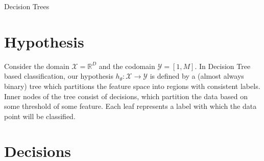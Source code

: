 \documentclass[12pt]{article}
\begin{document}
\begin{center}
	\LARGE{Decision Trees}
\end{center}

\section{Hypothesis}

Consider the domain $\mathcal{X} = \mathbb{R}^D$ and the codomain  $\mathcal{Y} =[1, M]$. In Decision Tree based classification, our hypothesis $h_\theta : \mathcal{X} \rightarrow \mathcal{Y}$ is defined by a (almost always binary) tree which partitions the feature space into regions with consistent labels. Inner nodes of the tree consist of decisions, which partition the data based on some threshold of some feature. Each leaf represents a label with which the data point will be classified.

\section{Decisions}
\end{document}
